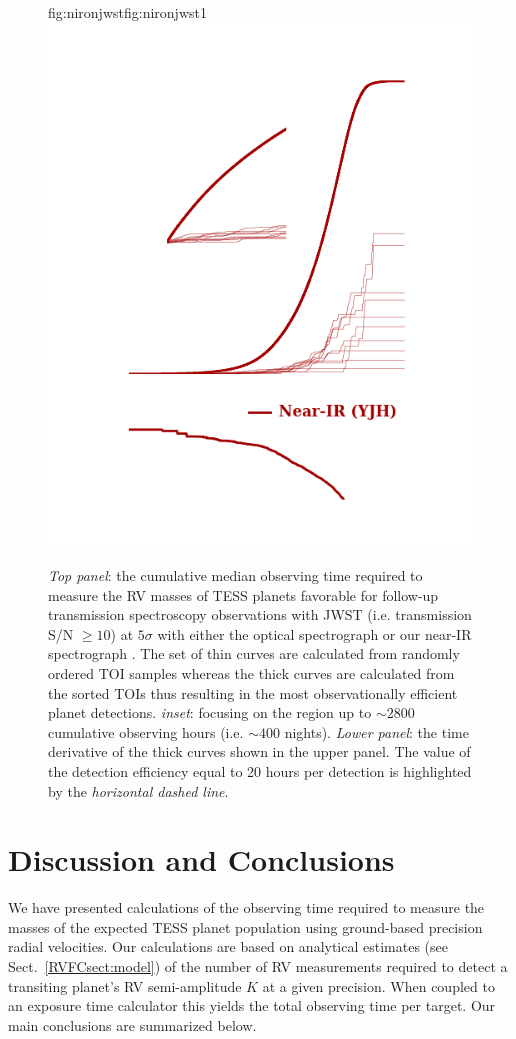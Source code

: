 \begin{figure}
  \begin{ocg}{fig:nironjwst}{fig:nironjwst}{1}%
   \includegraphics[width=0.6\hsize]{figures/cumulativetobsGP_transmission_nir.png}%
  \end{ocg}
  \hspace{-0.6\hsize}%
  \caption[Cumulative mean observing times to measure RV masses of TOI planets of interest for transmission spectroscopy follow-up with JWST.]
          {\small \emph{Top panel}: the cumulative median observing time required to measure the
    RV masses of TESS planets favorable for follow-up transmission spectroscopy observations with
    JWST (i.e. transmission S/N $\geq 10$) at $5\sigma$ with either the optical spectrograph
     or our
    near-IR spectrograph 
    . The set of 
    thin curves are calculated from randomly ordered TOI samples whereas the thick curves are
    calculated from the sorted TOIs thus resulting in the most observationally efficient planet
    detections. \emph{inset}: focusing on the region up to $\sim 2800$ cumulative observing hours
    (i.e. $\sim 400$ nights).
    \emph{Lower panel}: the time derivative of the thick curves shown in the upper panel.
    The value of the detection efficiency equal to 20 hours per detection is highlighted
    by the \emph{horizontal dashed line}.}
  \label{RVFCfig:trans}
\end{figure}


\section{Discussion and Conclusions} \label{RVFCsect:disc}
We have presented calculations of the observing time required to measure the masses of the
expected TESS planet population using ground-based precision radial velocities. Our calculations
are based on analytical estimates (see Sect.~\ref{RVFCsect:model})
of the number of RV measurements required to detect a transiting
planet's RV semi-amplitude $K$ at a given precision. When coupled to an exposure time calculator this
yields the total observing time per target. Our main conclusions are summarized below.

